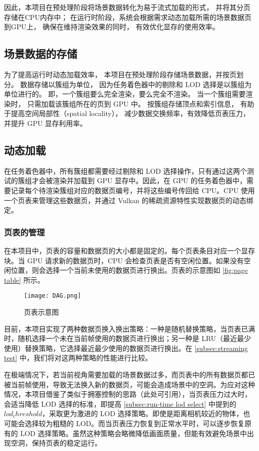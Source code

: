 因此，本项目在预处理阶段将场景数据转化为易于流式加载的形式，
并将其分页存储在CPU内存中；
在运行时阶段，系统会根据需求动态加载所需的场景数据页到GPU上，
确保在维持渲染效果的同时，
有效优化显存的使用效率。

\subsection{场景数据的存储}

为了提高运行时动态加载效率，  
本项目在预处理阶段存储场景数据，并按页划分。  
数据存储以簇组为单位，  
因为任务着色器中的剔除和 LOD 选择是以簇组为单位进行的。  
即，一个簇组要么完全渲染，要么完全不渲染。
当一个簇组需要渲染时，  
只需加载该簇组所在的页到 GPU 中。  
按簇组存储顶点和索引信息，  
有助于提高空间局部性（spatial locality），  
减少数据交换频率，有效降低页表压力，并提升 GPU 显存利用率。

\subsection{动态加载}

在任务着色器中，所有簇组都需要经过剔除和 LOD 选择操作，只有通过这两个测试的簇组才会被渲染并加载到 GPU 显存中。因此，在 GPU 的任务着色器中，需要记录每个待渲染簇组对应的数据页编号，并将这些编号传回给 CPU。CPU 使用一个页表来管理这些数据页，并通过 Vulkan 的稀疏资源特性实现数据页的动态绑定。

\subsubsection{页表的管理}

在本项目中，页表的容量和数据页的大小都是固定的。每个页表条目对应一个显存块。当 GPU 请求新的数据页时，CPU 会检查页表是否有空闲位置。如果没有空闲位置，则会选择一个当前未使用的数据页进行换出。页表的示意图如 \autoref{fig:page table} 所示。

\begin{figure}[!htb]
    \centering
    \texttt{[image: DAG.png]}
    \caption{\label{fig:page}页表示意图}
\end{figure}

目前，本项目实现了两种数据页换入换出策略：一种是随机替换策略，当页表已满时，随机选择一个未在当前帧使用的数据页进行换出；另一种是 LRU（最近最少使用）替换策略，它选择最近最少使用的数据页进行换出。在 \ref{subsec:streaming test} 中，我们将对这两种策略的性能进行比较。

在极端情况下，若当前视角需要加载的场景数据过多，而页表中的所有数据页都已被当前帧使用，导致无法换入新的数据页，可能会造成场景中的空洞。为应对这种情况，本项目借鉴了类似于拥塞控制的思路（此处可引用），当页表压力过大时，会适当降低 LOD 选择的标准，即提高 \ref{subsec:run-time lod select} 中提到的 $lod_threshold$，采取更为激进的 LOD 选择策略。即使是距离相机较近的物体，也可能会选择较为粗糙的 LOD。而当页表压力恢复到正常水平时，可以逐步恢复原有的 LOD 选择策略。虽然这种策略会略微降低画面质量，但能有效避免场景中出现空洞，保持页表的稳定运行。

